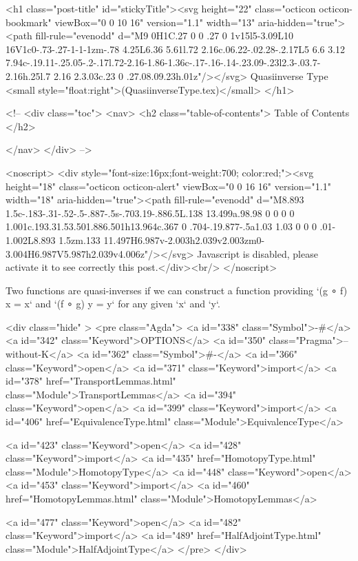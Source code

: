   <h1 class="post-title" id="stickyTitle"><svg height="22" class="octicon octicon-bookmark" viewBox="0 0 10 16" version="1.1" width="13" aria-hidden="true"><path fill-rule="evenodd" d="M9 0H1C.27 0 0 .27 0 1v15l5-3.09L10 16V1c0-.73-.27-1-1-1zm-.78 4.25L6.36 5.61l.72 2.16c.06.22-.02.28-.2.17L5 6.6 3.12 7.94c-.19.11-.25.05-.2-.17l.72-2.16-1.86-1.36c-.17-.16-.14-.23.09-.23l2.3-.03.7-2.16h.25l.7 2.16 2.3.03c.23 0 .27.08.09.23h.01z"/></svg> Quasiinverse Type <small style="float:right">(QuasiinverseType.tex)</small>
  </h1>

  <!-- 
  <div class="toc">
    <nav>
    <h2 class="table-of-contents"> Table of Contents </h2>
      

    </nav>
  </div>
   -->

  <noscript>
  <div style="font-size:16px;font-weight:700; color:red;"><svg height="18" class="octicon octicon-alert" viewBox="0 0 16 16" version="1.1" width="18" aria-hidden="true"><path fill-rule="evenodd" d="M8.893 1.5c-.183-.31-.52-.5-.887-.5s-.703.19-.886.5L.138 13.499a.98.98 0 0 0 0 1.001c.193.31.53.501.886.501h13.964c.367 0 .704-.19.877-.5a1.03 1.03 0 0 0 .01-1.002L8.893 1.5zm.133 11.497H6.987v-2.003h2.039v2.003zm0-3.004H6.987V5.987h2.039v4.006z"/></svg> Javascript is disabled, please activate it to see correctly this post.</div><br/>
  </noscript>

  Two functions are quasi-inverses if we can construct a function providing
`(g ∘ f) x = x` and `(f ∘ g) y = y` for any given `x` and `y`.

<div class="hide" >
<pre class="Agda">
<a id="338" class="Symbol">{-#</a> <a id="342" class="Keyword">OPTIONS</a> <a id="350" class="Pragma">--without-K</a> <a id="362" class="Symbol">#-}</a>
<a id="366" class="Keyword">open</a> <a id="371" class="Keyword">import</a> <a id="378" href="TransportLemmas.html" class="Module">TransportLemmas</a>
<a id="394" class="Keyword">open</a> <a id="399" class="Keyword">import</a> <a id="406" href="EquivalenceType.html" class="Module">EquivalenceType</a>

<a id="423" class="Keyword">open</a> <a id="428" class="Keyword">import</a> <a id="435" href="HomotopyType.html" class="Module">HomotopyType</a>
<a id="448" class="Keyword">open</a> <a id="453" class="Keyword">import</a> <a id="460" href="HomotopyLemmas.html" class="Module">HomotopyLemmas</a>


<a id="477" class="Keyword">open</a> <a id="482" class="Keyword">import</a> <a id="489" href="HalfAdjointType.html" class="Module">HalfAdjointType</a>
</pre>
</div>

